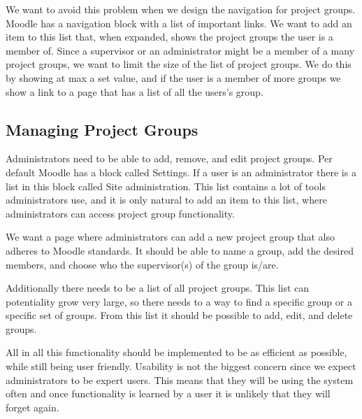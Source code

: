 We want to avoid this problem when we design the navigation for project groups.
Moodle has a navigation block with a list of important links.
We want to add an item to this list that, when expanded, shows the project groups the user is a member of.
Since a supervisor or an administrator might be a member of a many project groups, we want to limit the size of the list of project groups.
We do this by showing at max a set value, and if the user is a member of more groups we show a link to a page that has a list of all the users's group.

\subsection{Managing Project Groups}
Administrators need to be able to add, remove, and edit project groups.
Per default Moodle has a block called Settings. 
If a user is an administrator there is a list in this block called Site administration. 
This list contains a lot of tools administrators use, and it is only natural to add an item to this list, where administrators can access project group functionality.

We want a page where administrators can add a new project group that also adheres to Moodle standards.
It should be able to name a group, add the desired members, and choose who the supervisor(s) of the group is/are.

Additionally there needs to be a list of all project groups.
This list can potentiality grow very large, so there needs to a way to find a specific group or a specific set of groups. 
From this list it should be possible to add, edit, and delete groups. 

All in all this functionality should be implemented to be as efficient as possible, while still being user friendly.
Usability is not the biggest concern since we expect administrators to be expert users.
This means that they will be using the system often and once functionality is learned by a user it is unlikely that they will forget again.
